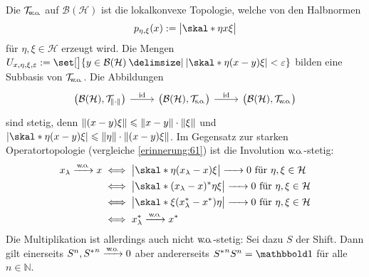 \begin{erinnerungA}[{name=[schwache Operatortopologie]}]
	Die  $\TWeakOp$ auf $\mathcal{B}(\mathcal{H})$ ist die lokalkonvexe Topologie, welche von den Halbnormen
	\[
		p_{\eta,\xi}(x) := \abs[\big]{\skal*{\eta}{x \xi}} 
	\]
	für $\eta,\xi \in \mathcal{H}$ erzeugt wird.
	Die Mengen $U_{x,\eta,\xi,\varepsilon} := \set[\big]{y \in \mathcal{B}(\mathcal{H}) \given \abs*{\skal*{\eta}{(x-y)\xi}} < \varepsilon}$ bilden eine Subbasis von $\TWeakOp$.
	Die Abbildungen
	\[
		\begin{tikzcd}
			\enbrace[\big]{\mathcal{B}(\mathcal{H}),\Top{\norm*{\cdot}}} \rar["\id"] & \enbrace[\big]{\mathcal{B}(\mathcal{H}),\Top{\so}} \rar["\id"] & \enbrace[\big]{\mathcal{B}(\mathcal{H}), \TWeakOp}
		\end{tikzcd}
	\]
	sind stetig, denn $\norm*{(x-y)\xi} \le \norm*{x-y} \cdot \norm*{\xi}$ und $\abs*{ \skal*{\eta}{(x-y)\xi}} \le \norm*{\eta} \cdot \norm*{(x-y) \xi}$.
	Im Gegensatz zur starken Operatortopologie (vergleiche \autoref{erinnerung:61}) ist die Involution $\wo$-stetig:
	\begin{align}
		x_\lambda \grenzw{\wo} x &\iff \abs[\big]{\skal*{\eta}{(x_\lambda-x)\xi}} \grenzw{} 0 \text{ für } \eta,\xi \in \mathcal{H} \\
		&\iff \abs[\big]{\skal*{(x_\lambda-x)^* \eta}{\xi}}   \grenzw{} 0 \text{ für } \eta,\xi \in \mathcal{H} \\
		&\iff \abs[\big]{\skal*{\xi}{(x_\lambda^* -x^*) \eta}} \grenzw{} 0 \text{ für } \eta,\xi \in \mathcal{H} \\
		&\iff x_\lambda^* \grenzw{\wo} x^* 
	\end{align}
	Die Multiplikation ist allerdings auch nicht $\wo$-stetig: Sei dazu $S$ der Shift. Dann gilt einerseits $S^n,{S^*}^n \grenzw{\wo} 0$ aber andererseits ${S^*}^n S^n=\ind$ für alle $n \in \mathbb{N}$.
\end{erinnerungA}

